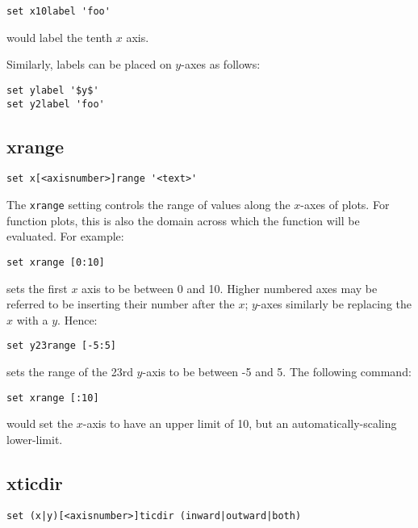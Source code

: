 \begin{verbatim}
set x10label 'foo'
\end{verbatim}

\noindent would label the tenth $x$ axis.

Similarly, labels can be placed on $y$-axes as follows:

\begin{verbatim}
set ylabel '$y$' 
set y2label 'foo'
\end{verbatim}


\subsection{xrange}

\begin{verbatim}
set x[<axisnumber>]range '<text>'
\end{verbatim}

The {\tt xrange} setting controls the range of values along the $x$-axes of
plots.  For function plots, this is also the domain across which the function
will be evaluated.  For example:

\begin{verbatim}
set xrange [0:10]
\end{verbatim}

\noindent sets the first $x$ axis to be between 0 and 10.  Higher numbered axes may be
referred to be inserting their number after the $x$; $y$-axes similarly be
replacing the $x$ with a $y$.  Hence:

\begin{verbatim}
set y23range [-5:5]
\end{verbatim}

\noindent sets the range of the 23rd $y$-axis to be between -5 and 5.  The
following command:

\begin{verbatim}
set xrange [:10]
\end{verbatim}

\noindent would set the $x$-axis to have an upper limit of 10, but an
automatically-scaling lower-limit.

\subsection{xticdir}

\begin{verbatim}
set (x|y)[<axisnumber>]ticdir (inward|outward|both)
\end{verbatim}

